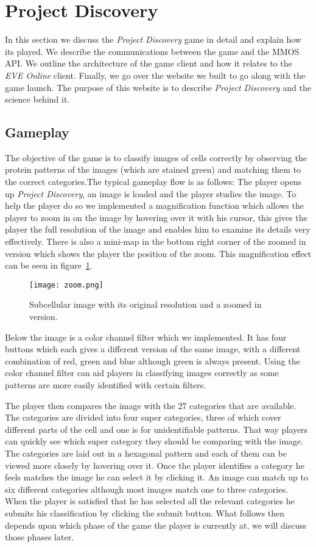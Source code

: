 \section{Project Discovery}\label{sec:projectdiscovery}
In this section we discuss the \emph{Project Discovery} game in detail and explain how its played. We describe the communications between the game and the MMOS API. We outline the architecture of the game client and how it relates to the \emph{EVE Online} client. Finally, we go over the website we built to go along with the game launch. The purpose of this website is to describe \emph{Project Discovery} and the science behind it.

\subsection{Gameplay}
The objective of the game is to classify images of cells correctly by observing the protein patterns of the images (which are stained green) and matching them to the correct categories.The typical gameplay flow is as follows: The player opens up \emph{Project Discovery}, an image is loaded and the player studies the image. To help the player do so we implemented a magnification function which allows the player to zoom in on the image by hovering over it with his cursor, this gives the player the full resolution of the image and enables him to examine its details very effectively. There is also a mini-map in the bottom right corner of the zoomed in version which shows the player the position of the zoom. This magnification effect can be seen in figure~\ref{fig:zoom}.

\begin{figure}[H]
\centering
\graphicspath{ {./graphics/} }
\centerline{\texttt{[image: zoom.png]}}
\caption{\label{fig:zoom}Subcellular image with its original resolution and a zoomed in version.}
\end{figure}

Below the image is a color channel filter which we implemented. It has four buttons which each gives a different version of the same image, with a different combination of red, green and blue although green is always present. Using the color channel filter can aid players in classifying images correctly as some patterns are more easily identified with certain filters.

The player then compares the image with the 27 categories that are available. The categories are divided into four super categories, three of which cover different parts of the cell and one is for unidentifiable patterns. That way players can quickly see which super category they should be comparing with the image. The categories are laid out in a hexagonal pattern and each of them can be viewed more closely by hovering over it. Once the player identifies a category he feels matches the image he can select it by clicking it. An image can match up to six different categories although most images match one to three categories. When the player is satisfied that he has selected all the relevant categories he submits his classification by clicking the submit button. What follows then depends upon which phase of the game the player is currently at, we will discuss those phases later.

